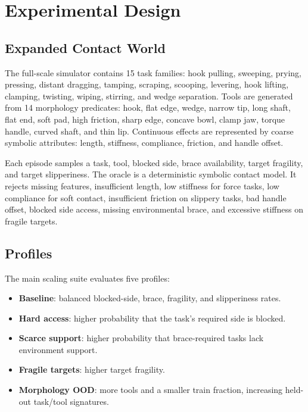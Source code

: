 \documentclass{article}
\begin{document}
\section{Experimental Design}

\subsection{Expanded Contact World}

The full-scale simulator contains 15 task families: hook pulling, sweeping, prying, pressing, distant dragging, tamping, scraping, scooping, levering, hook lifting, clamping, twisting, wiping, stirring, and wedge separation. Tools are generated from 14 morphology predicates: hook, flat edge, wedge, narrow tip, long shaft, flat end, soft pad, high friction, sharp edge, concave bowl, clamp jaw, torque handle, curved shaft, and thin lip. Continuous effects are represented by coarse symbolic attributes: length, stiffness, compliance, friction, and handle offset.

Each episode samples a task, tool, blocked side, brace availability, target fragility, and target slipperiness. The oracle is a deterministic symbolic contact model. It rejects missing features, insufficient length, low stiffness for force tasks, low compliance for soft contact, insufficient friction on slippery tasks, bad handle offset, blocked side access, missing environmental brace, and excessive stiffness on fragile targets.

\subsection{Profiles}

The main scaling suite evaluates five profiles:
\begin{itemize}
    \item \textbf{Baseline}: balanced blocked-side, brace, fragility, and slipperiness rates.
    \item \textbf{Hard access}: higher probability that the task's required side is blocked.
    \item \textbf{Scarce support}: higher probability that brace-required tasks lack environment support.
    \item \textbf{Fragile targets}: higher target fragility.
    \item \textbf{Morphology OOD}: more tools and a smaller train fraction, increasing held-out task/tool signatures.
\end{itemize}
\end{document}
